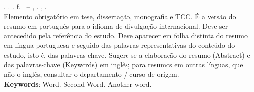
\begin{resumo}[ABSTRACT]
\begin{SingleSpacing}

\imprimirautorcitacao. \imprimirtitleabstract. \imprimirdata. \pageref {LastPage} f. \imprimirprojeto\ – \imprimirprograma, \imprimirinstituicao. \imprimirlocal, \imprimirdata.\\

Elemento obrigatório em tese, dissertação, monografia e TCC. É a versão do resumo em português para o idioma de divulgação internacional. Deve ser antecedido pela referência do estudo. Deve aparecer em folha distinta do resumo em língua portuguesa e seguido das palavras representativas do conteúdo do estudo, isto é, das palavras-chave. Sugere-se a elaboração do resumo (Abstract) e das palavras-chave (Keywords) em inglês; para resumos em outras línguas, que não o inglês, consultar o departamento / curso de origem.\\

\textbf{Keywords}: Word. Second Word. Another word.

\end{SingleSpacing}
\end{resumo}

